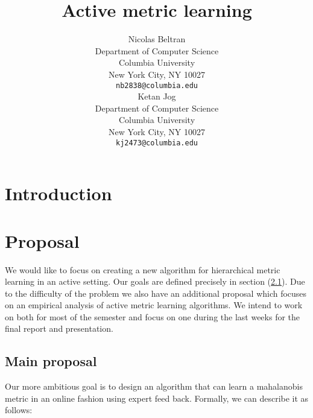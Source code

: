 \documentclass{article}
\title{Active metric learning}
\author{
  Nicolas Beltran\\
  Department of Computer Science\\
  Columbia University\\
  New York City, NY 10027 \\
  \texttt{nb2838@columbia.edu}\\
  \And
  Ketan Jog\\
  Department of Computer Science\\
  Columbia University\\
  New York City, NY 10027 \\
  \texttt{kj2473@columbia.edu}\\
}
\begin{document}
\maketitle

\begin{abstract}

\end{abstract}

\section{Introduction}




\section{Proposal}
We would like to focus on creating a new algorithm for hierarchical metric learning in an active setting. 
Our goals are defined precisely in section (\ref{main-prop}).
Due to the difficulty of the problem we also have an additional proposal which focuses on an empirical analysis of active metric learning algorithms. 
We intend to work on both for most of the semester and focus on one during the last weeks for the final report and presentation. 


\subsection{Main proposal}
\label{main-prop}
Our more ambitious goal is to design an algorithm that can learn a mahalanobis metric in an online fashion using expert feed back. Formally, we can describe it as follows:
\end{document}
